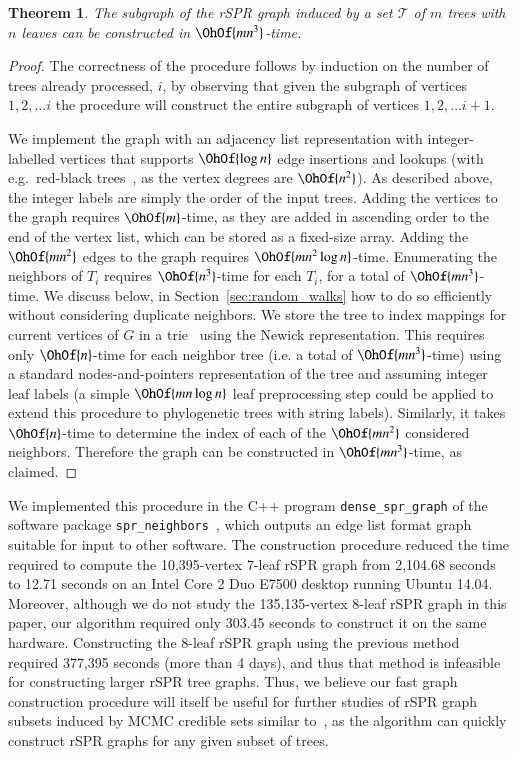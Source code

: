 \documentclass[]{elsarticle}
\newtheorem{thm}{Theorem}[section]
\begin{document}
\begin{thm}
	\label{thm:construct_graph}
	The subgraph of the rSPR graph induced by a set $\mathcal{T}$ of $m$ trees with $n$ leaves can be constructed in $\OhOf{mn^3}$-time.
\end{thm}
\begin{proof}
	The correctness of the procedure follows by induction on the number of trees already processed, $i$, by observing that given the subgraph of vertices $1, 2,  \ldots i$ the procedure will construct the entire subgraph of vertices $1, 2, \ldots i+1$.

	We implement the graph with an adjacency list representation with integer-labelled vertices that supports $\OhOf{\log n}$ edge insertions and lookups (with e.g.~red-black trees~\citep{guibas1978dichromatic}, as the vertex degrees are $\OhOf{n^2}$).
	As described above, the integer labels are simply the order of the input trees.
	Adding the vertices to the graph requires $\OhOf{m}$-time, as they are added in ascending order to the end of the vertex list, which can be stored as a fixed-size array.
	Adding the $\OhOf{mn^2}$ edges to the graph requires $\OhOf{mn^2 \log n}$-time.
	Enumerating the neighbors of $T_i$ requires $\OhOf{n^3}$-time for each $T_i$, for a total of $\OhOf{mn^3}$-time.
	We discuss below, in Section~\ref{sec:random_walks} how to do so efficiently without considering duplicate neighbors.
	We store the tree to index mappings for current vertices of $G$ in a trie~\citep{fredkin1960trie} using the Newick representation.
	This requires only $\OhOf{n}$-time for each neighbor tree (i.e. a total of $\OhOf{mn^3}$-time) using a standard nodes-and-pointers representation of the tree and assuming integer leaf labels (a simple $\OhOf{mn\log n}$ leaf preprocessing step could be applied to extend this procedure to phylogenetic trees with string labels).
	Similarly, it takes $\OhOf{n}$-time to determine the index of each of the $\OhOf{mn^2}$ considered neighbors.
	Therefore the graph can be constructed in $\OhOf{mn^3}$-time, as claimed.
\end{proof}

We implemented this procedure in the C++ program \texttt{dense\_spr\_graph} of the software package \texttt{spr\_neighbors}~\citep{spr_neighbors}, which outputs an edge list format graph suitable for input to other software.
The construction procedure reduced the time required to compute the 10,395-vertex 7-leaf rSPR graph from 2,104.68 seconds to 12.71 seconds on an Intel Core 2 Duo E7500 desktop running Ubuntu 14.04.
Moreover, although we do not study the 135,135-vertex 8-leaf rSPR graph in this paper, our algorithm required only 303.45 seconds to construct it on the same hardware.
Constructing the 8-leaf rSPR graph using the previous method required 377,395 seconds (more than 4 days), and thus that method is infeasible for constructing larger rSPR tree graphs.
Thus, we believe our fast graph construction procedure will itself be useful for further studies of rSPR graph subsets induced by MCMC credible sets similar to~\citep{Whidden2015-yi}, as the algorithm can quickly construct rSPR graphs for any given subset of trees.
\end{document}
